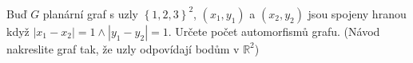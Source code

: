 \subsubsection{}
Buď $G$ planární graf s uzly $\left \{ 1,2,3 \right \}^{2}$, $\left (
x_{1},y_{1} \right )$ a $\left ( x_{2},y_{2} \right )$ jsou spojeny hranou když
$\left | x_{1}-x_{2} \right |=1 \wedge \left | y_{1}-y_{2} \right |=1 $. Určete
počet automorfismů grafu. (Návod nakreslite graf tak, že uzly odpovídají bodům v
$\mathbb{R}^{2}$)
